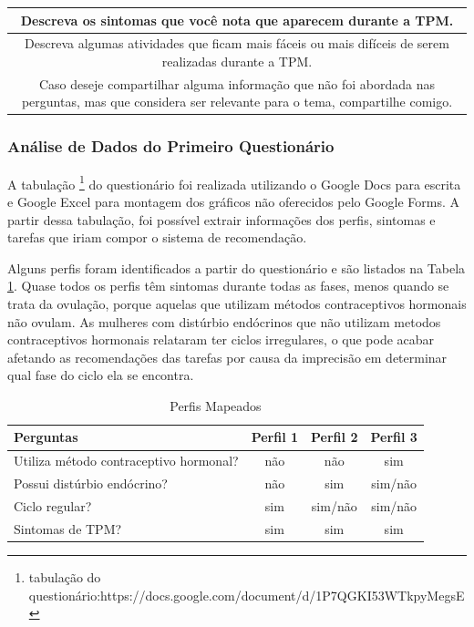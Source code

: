 \begin{table}[ht]
\begin{tabular}{c}
        \midrule
        \begin{minipage} [t] {1\textwidth} Descreva os sintomas que você nota que aparecem durante a TPM.\end{minipage}\\
        \midrule
        \begin{minipage} [t] {1\textwidth} Descreva algumas atividades que ficam mais fáceis ou mais difíceis de serem realizadas durante a TPM.\end{minipage}\\
        \midrule
        \begin{minipage} [t] {1\textwidth} Caso deseje compartilhar alguma informação que não foi abordada nas perguntas, mas que considera ser relevante para o tema, compartilhe comigo. \end{minipage}\\

        \bottomrule
    \end{tabular} 
\end{table}


\subsubsection{Análise de Dados do Primeiro Questionário}

A tabulação \footnote{tabulação do questionário:https://docs.google.com/document/d/1P7QGKI53WTkpyMegsE} do 
questionário foi realizada utilizando o Google Docs para escrita e Google Excel para montagem 
dos gráficos não oferecidos 
pelo Google Forms. A partir dessa tabulação, foi possível extrair informações dos perfis, 
sintomas e tarefas que iriam compor o sistema de recomendação.

Alguns perfis foram identificados a partir do questionário e são listados na Tabela \ref{tab08}. 
Quase todos os perfis têm sintomas durante todas as fases, menos quando se trata da ovulação, porque aquelas 
que utilizam métodos contraceptivos hormonais não ovulam. As mulheres com distúrbio endócrinos 
que não utilizam metodos contraceptivos hormonais relataram ter ciclos irregulares, o que pode acabar afetando 
as recomendações das tarefas por causa da imprecisão em determinar qual fase do ciclo ela se encontra.

\begin{table}[] 
    \caption{Perfis Mapeados}
    \label{tab08} 
    \begin{tabular}{|l|c|c|c|}
    \hline
    \rowcolor[HTML]{C0C0C0} 
     Perguntas & Perfil 1 & Perfil 2 & Perfil 3  \\ \hline
     Utiliza método contraceptivo hormonal?& não & não & sim \\ \hline
    \rowcolor[HTML]{EFEFEF} 
    Possui distúrbio endócrino? & não & sim & sim/não \\ \hline
    Ciclo regular? & sim & sim/não & sim/não  \\ \hline
    \rowcolor[HTML]{EFEFEF} 
    Sintomas de TPM? & sim & sim & sim \\ \hline
    \end{tabular}
    \end{table}



